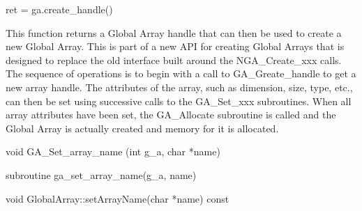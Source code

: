 \documentclass[10pt]{article}
\begin{document}
\begin{pyapi}
\begin{pycode}
ret = ga.create_handle()
\end{pycode}
\end{pyapi}

\dcoll

\begin{desc}

This function returns a Global Array handle that can then be used to create a
new Global Array. This is part of a new API for creating Global Arrays that is
designed to replace the old interface built around the NGA_Create_xxx calls.
The sequence of operations is to begin with a call to GA_Greate_handle to get a
new array handle. The attributes of the array, such as dimension, size, type,
etc., can then be set using successive calls to the GA_Set_xxx subroutines.
When all array attributes have been set, the GA_Allocate subroutine is called
and the Global Array is actually created and memory for it is allocated.

\end{desc}



\begin{capi}
\begin{ccode}
void GA_Set_array_name (int g_a, char *name)
\end{ccode}
\begin{funcargs}
\end{funcargs}
\end{capi}

\begin{fapi}
\begin{fcode}
subroutine ga_set_array_name(g_a, name)
\end{fcode}
\begin{funcargs}
\end{funcargs}
\end{fapi}

\begin{cxxapi}
\begin{cxxcode}
void GlobalArray::setArrayName(char *name) const
\end{cxxcode}
\begin{funcargs}
\end{funcargs}
\end{cxxapi}
\end{document}
